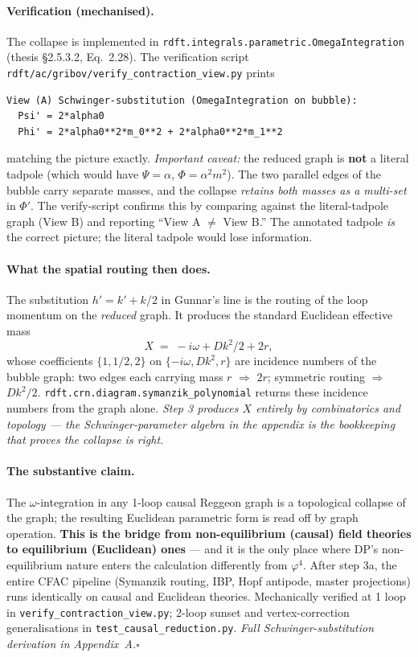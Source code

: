 \documentclass[11pt,a4paper]{article}
\begin{document}
\begin{cfacbox}
\paragraph{Verification (mechanised).} The collapse is implemented in
\texttt{rdft.integrals.parametric.OmegaIntegration} (thesis \S 2.5.3.2,
Eq.~2.28). The verification script
\texttt{rdft/ac/gribov/verify\_contraction\_view.py} prints
\begin{verbatim}
View (A) Schwinger-substitution (OmegaIntegration on bubble):
  Psi' = 2*alpha0
  Phi' = 2*alpha0**2*m_0**2 + 2*alpha0**2*m_1**2
\end{verbatim}
matching the picture exactly. \emph{Important caveat:} the reduced graph is \textbf{not}
a literal tadpole (which would have $\Psi=\alpha$, $\Phi=\alpha^{2}m^{2}$). The two
parallel edges of the bubble carry separate masses, and the collapse \emph{retains both
masses as a multi-set} in $\Phi'$. The verify-script confirms this by comparing against
the literal-tadpole graph (View B) and reporting ``View A $\ne$ View B.'' The annotated
tadpole \emph{is} the correct picture; the literal tadpole would lose information.

\paragraph{What the spatial routing then does.} The substitution $h' = k' + k/2$ in
Gunnar's line is the routing of the loop momentum on the \emph{reduced} graph. It produces
the standard Euclidean effective mass
\[
X \;=\; -i\omega + Dk^{2}/2 + 2r,
\]
whose coefficients $\{1,1/2,2\}$ on $\{-i\omega, Dk^{2}, r\}$ are incidence numbers of the
bubble graph: two edges each carrying mass $r$ $\Rightarrow$ $2r$; symmetric routing
$\Rightarrow$ $Dk^{2}/2$. \texttt{rdft.crn.diagram.symanzik\_polynomial} returns these
incidence numbers from the graph alone. \emph{Step 3 produces $X$ entirely by
combinatorics and topology --- the Schwinger-parameter algebra in the appendix is the
bookkeeping that proves the collapse is right.}

\paragraph{The substantive claim.} The $\omega$-integration in any 1-loop causal Reggeon
graph is a topological collapse of the graph; the resulting Euclidean parametric form is
read off by graph operation. \textbf{This is the bridge from non-equilibrium (causal)
field theories to equilibrium (Euclidean) ones} --- and it is the only place where DP's
non-equilibrium nature enters the calculation differently from $\varphi^{4}$. After step
3a, the entire CFAC pipeline (Symanzik routing, IBP, Hopf antipode, master projections)
runs identically on causal and Euclidean theories. Mechanically verified at 1 loop in
\texttt{verify\_contraction\_view.py}; 2-loop sunset and vertex-correction generalisations
in \texttt{test\_causal\_reduction.py}. \emph{Full Schwinger-substitution derivation in
Appendix~A.}\hfill$\square$
\end{cfacbox}
\end{document}
